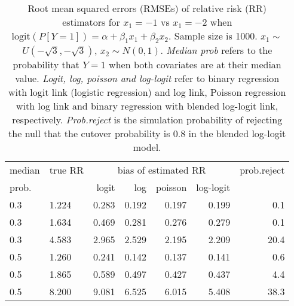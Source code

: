 \documentclass[12pt,a4paper]{article}
\begin{document}
\begin{table}[H] 
\small\sf\centering 
\caption{Root mean squared errors (RMSEs) of relative risk (RR) estimators for $x_1=-1$ vs $x_1=-2$ when $\mbox{logit}(P[Y=1])=\alpha+\beta_1 x_1 + \beta_2 x_2$. Sample size is 1000. $x_1 \sim $$U(-\sqrt{3},-\sqrt{3})$, $x_2 \sim N(0,1)$. {\it Median prob} refers to the probability that $Y=1$ when both covariates are at their median value. {\it Logit, log, poisson and log-logit} refer to binary regression with logit link (logistic regression) and log link, Poisson regression with log link and binary regression with blended log-logit link, respectively. {\it Prob.reject} is the simulation probability of rejecting the null that the cutover probability is $0.8$ in the blended log-logit model.} 
\begin{tabular}{llrrrrr} 
\toprule 
median & true RR & \multicolumn{4}{c}{bias of estimated RR} & prob.reject \\ 
prob. & & logit & log & poisson & log-logit  & \\ \midrule 
0.3 & 1.224 & 0.283 & 0.192 & 0.197 & 0.199 &  0.1 \\  
0.3 & 1.634 & 0.469 & 0.281 & 0.276 & 0.279 &  0.1 \\  
0.3 & 4.583 & 2.965 & 2.529 & 2.195 & 2.209 & 20.4 \\  
0.5 & 1.260 & 0.241 & 0.142 & 0.137 & 0.141 &  0.6 \\  
0.5 & 1.865 & 0.589 & 0.497 & 0.427 & 0.437 &  4.4 \\  
0.5 & 8.200 & 9.081 & 6.525 & 6.015 & 5.408 & 38.3 \\  
\bottomrule 
\end{tabular} 
\end{table} 
\end{document}
